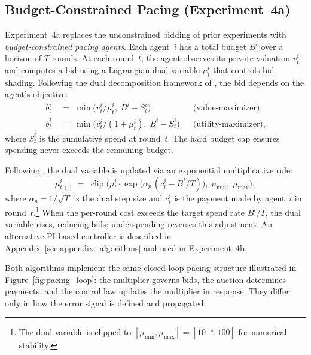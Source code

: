 \subsection{Budget-Constrained Pacing (Experiment~4a)}

Experiment~4a replaces the unconstrained bidding of prior experiments with \emph{budget-constrained pacing agents}. Each agent~$i$ has a total budget $B^i$ over a horizon of $T$ rounds. At each round~$t$, the agent observes its private valuation $v_t^i$ and computes a bid using a Lagrangian dual variable $\mu_t^i$ that controls bid shading. Following the dual decomposition framework of \citet{Balseiro2019Learning}, the bid depends on the agent's objective:
\begin{align}
b_t^i &\;=\; \min\!\bigl(v_t^i / \mu_t^i,\; B^i - S_t^i\bigr) & &\text{(value-maximizer),} \label{eq:bid_vmax_algo}\\
b_t^i &\;=\; \min\!\bigl(v_t^i / (1 + \mu_t^i),\; B^i - S_t^i\bigr) & &\text{(utility-maximizer),} \label{eq:bid_umax_algo}
\end{align}
where $S_t^i$ is the cumulative spend at round~$t$. The hard budget cap ensures spending never exceeds the remaining budget.

Following \citet{Balseiro2019Learning}, the dual variable is updated via an exponential multiplicative rule:
\begin{equation}
\mu_{t+1}^i \;=\; \operatorname{clip}\!\bigl(\mu_t^i \cdot \exp\!\bigl(\alpha_p\,(c_t^i - B^i/T)\bigr),\; \mu_{\min},\; \mu_{\max}\bigr),
\label{eq:dual_update}
\end{equation}
where $\alpha_p = 1/\!\sqrt{T}$ is the dual step size and $c_t^i$ is the payment made by agent~$i$ in round~$t$.\footnote{The dual variable is clipped to $[\mu_{\min}, \mu_{\max}] = [10^{-4}, 100]$ for numerical stability.} When the per-round cost exceeds the target spend rate $B^i/T$, the dual variable rises, reducing bids; underspending reverses this adjustment. An alternative PI-based controller is described in Appendix~\ref{sec:appendix_algorithms} and used in Experiment~4b.

Both algorithms implement the same closed-loop pacing structure illustrated in Figure~\ref{fig:pacing_loop}: the multiplier governs bids, the auction determines payments, and the control law updates the multiplier in response. They differ only in how the error signal is defined and propagated.

